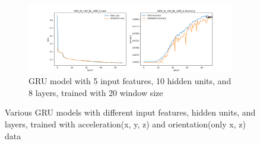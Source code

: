 \documentclass{article}
\begin{document}
\begin{figure}[ht]
\begin{subfigure}
            \label{fig:GRU_5I_10H_4L_20W_A_GRAPH}
        \end{subfigure}
        \begin{subfigure}
            {\textwidth}
            \centering
            \includegraphics[width=\textwidth]{GRU_5I_10H_8L_20W_A_GRAPH.png}
            \caption{GRU model with 5 input features, 10 hidden units, and 8
            layers, trained with 20 window size}
            \label{fig:GRU_5I_10H_8L_20W_A_GRAPH}
        \end{subfigure}
        \caption{Various GRU models with different input features, hidden units,
        and layers, trained with acceleration(x, y, z) and orientation(only x, z)
        data}
        \label{fig:GRU_5I_10H}
    \end{figure}
\end{document}
